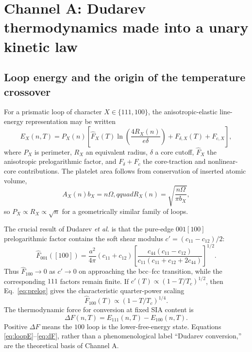 \documentclass[11pt,a4paper]{article}
\begin{document}
\section{Channel A: Dudarev thermodynamics made into a unary kinetic law}

\subsection{Loop energy and the origin of the temperature crossover}

For a prismatic loop of character $X\in\{111,100\}$, the anisotropic-elastic line-energy representation may be written
\begin{equation}
 E_X(n,T)=P_X(n)\left[
 \widehat F_X(T)\ln\!\left(\frac{4R_X(n)}{e\delta}\right)
 +F_{\delta,X}(T)+F_{c,X}\right],                                      \label{eq:loopE}
\end{equation}
where $P_X$ is perimeter, $R_X$ an equivalent radius, $\delta$ a core cutoff, $\widehat F_X$ the anisotropic prelogarithmic factor, and $F_\delta+F_c$ the core-traction and nonlinear-core contributions.  The platelet area follows from conservation of inserted atomic volume,
\begin{equation}
 A_X(n)b_X=n\Omega,qquad R_X(n)=\sqrt{\frac{n\Omega}{\pi b_X}},          \label{eq:area}
\end{equation}
so $P_X\propto R_X\propto\sqrt n$ for a geometrically similar family of loops.

The crucial result of Dudarev \emph{et al.} is that the pure-edge $001[100]$ prelogarithmic factor contains the soft shear modulus $c'=(c_{11}-c_{12})/2$:
\begin{equation}
 \widehat F_{001}([100])=
 \frac{a^2}{4\pi}(c_{11}+c_{12})
 \left[\frac{c_{44}(c_{11}-c_{12})}
 {c_{11}(c_{11}+c_{12}+2c_{44})}\right]^{1/2}.                         \label{eq:prelog}
\end{equation}
Thus $\widehat F_{100}\rightarrow0$ as $c'\rightarrow0$ on approaching the bcc--fcc transition, while the corresponding $111$ factors remain finite.  If $c'(T)\propto(1-T/T_c)^{1/2}$, then Eq.~\eqref{eq:prelog} gives the characteristic quarter-power scaling
\begin{equation}
 \widehat F_{100}(T)\propto(1-T/T_c)^{1/4}.                             \label{eq:quarter}
\end{equation}
The thermodynamic force for conversion at fixed SIA content is
\begin{equation}
 \Delta F(n,T)=E_{111}(n,T)-E_{100}(n,T).                               \label{eq:dF}
\end{equation}
Positive $\Delta F$ means the $100$ loop is the lower-free-energy state.  Equations \eqref{eq:loopE}--\eqref{eq:dF}, rather than a phenomenological label ``Dudarev conversion,'' are the theoretical basis of Channel A.
\end{document}
